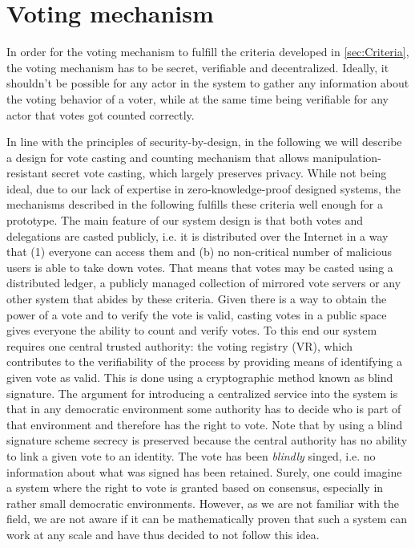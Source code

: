 \section{Voting mechanism}
\label{sec:Voting_Mechanism}
In order for the voting mechanism to fulfill the criteria developed in \ref{sec:Criteria}, the voting mechanism has to be secret, verifiable and decentralized. Ideally, it shouldn't be possible for any actor in the system to gather any information about the voting behavior of a voter, while at the same time being verifiable for any actor that votes got counted correctly. 

In line with the principles of security-by-design, in the following we will describe a design for vote casting and counting mechanism that allows manipulation-resistant secret vote casting, which largely preserves privacy.
While not being ideal, due to our lack of expertise in zero-knowledge-proof designed systems, the mechanisms described in the following fulfills these criteria well enough for a prototype.
The main feature of our system design is that both votes and delegations are casted publicly, i.e. it is distributed over the Internet in a way that (1) everyone can access them and (b) no non-critical number of malicious users is able to take down votes.
That means that votes may be casted using a distributed ledger, a publicly managed collection of mirrored vote servers or any other system that abides by these criteria.
Given there is a way to obtain the power of a vote and to verify the vote is valid, casting votes in a public space gives everyone the ability to count and verify votes.
To this end our system requires one central trusted authority: the voting registry (VR), which  contributes to the verifiability of the process by providing means of identifying a given vote as valid.
This is done using a cryptographic method known as blind signature.
The argument for introducing a centralized service into the system is that in any democratic environment some authority has to decide who is part of that environment and therefore has the right to vote.
Note that by using a blind signature scheme secrecy is preserved because the central authority has no ability to link a given vote to an identity.
The vote has been \emph{blindly} singed, i.e. no information about what was signed has been retained. 
Surely, one could imagine a system where the right to vote is granted based on consensus, especially in rather small democratic environments.
However, as we are not familiar with the field, we are not aware if it can be mathematically proven that such a system can work at any scale and have thus decided to not follow this idea.

